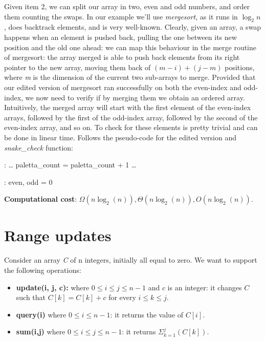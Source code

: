 \documentclass{article}
\begin{document}
Given item 2, we can split our array in two, even and odd numbers, and order
them counting the swaps.
In our example we'll use \emph{mergesort}, as it runs in $\log_2 n$, does
backtrack elements, and is very well-known.
Clearly, given an array, a swap happens when an element is pushed back, pulling
the one between its new position and the old one ahead: we can map this behaviour
in the merge routine of mergesort: the array merged is able to push back elements
from its right pointer to the new array, moving them back of $(m - i) + (j - m)$ positions,
where \emph{m} is the dimension of the current two sub-arrays to merge.
Provided that our edited version of mergesort ran successfully on both the
even-index and odd-index, we now need to verify if by merging them we obtain an
ordered array.
Intuitively, the merged array will start with the first element of the even-index
arrays, followed by the first of the odd-index array, followed by the second of
the even-index array, and so on.
To check for these elements is pretty trivial and can be done in linear time.
Follows the pseudo-code for the edited version and \emph{snake\_check} function:

\begin{algorithmic}[1]
  :
    \State \dots \;                        
    \State {}
      \State paletta\_count = paletta\_count + 1\;
      \State \dots \;
      \EndIf
    \EndFunction
\end{algorithmic}

\begin{algorithmic}[1]
  :
    \State even, odd = 0\;
      \State {}
        \State {}\;
        \EndIf
    \EndFor

    \;
    \EndFunction
\end{algorithmic}

\begin{framed}
  \noindent
  \textbf{Computational cost}: $\Omega(n\log_2(n)), \Theta(n\log_2(n)), O(n\log_2(n))$.
\end{framed}


\newpage
\section{Range updates}

Consider an array \emph{C} of n integers, initially all equal to zero.
We want to support the following operations:
\begin{itemize}
    \item \textbf{update(i, j, c):} where $0 \leq i \leq j \leq n - 1$ and $c$ is
    an integer: it changes $C$ such that $C[k] = C[k] + c$ for every $i \leq k \leq j$.
    \item \textbf{query(i)} where $0 \leq i \leq n - 1$: it returns the value of $C[i]$.
    \item \textbf{sum(i,j)} where $0 \leq i \leq j \leq n - 1$: it returns
                    $\Sigma_{k = 1}^{j}(C[k])$.
\end{itemize}
\end{document}

